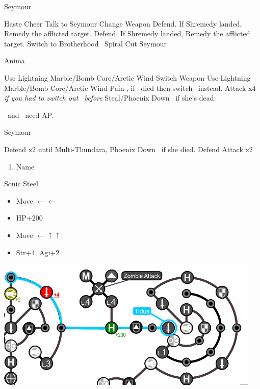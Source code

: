 \begin{battle}[3000]{Seymour}
	\begin{itemize}
		\tidusf Haste \tidus
		\tidusf Cheer
		\tidusf Talk to Seymour
		\yunaf Change Weapon
		\switch{\kimahri}{\rikku}
		\rikkuf Defend. If Shremedy landed, Remedy the afflicted target.
		\switch{\yuna}{\kimahri}
		\kimahrif Defend. If Shremedy landed, Remedy the afflicted target.
		\tidusf Switch to Brotherhood
		\tidusf \od\ Spiral Cut Seymour
	\end{itemize}
\end{battle}
\vfill
\begin{battle}[18000]{Anima}
	\begin{itemize}
		\rikkuf Use Lightning Marble/Bomb Core/Arctic Wind
		\switch{\tidus}{\wakka}
		\wakkaf Switch Weapon
		\kimahrif Use Lightning Marble/Bomb Core/Arctic Wind
		\enemyf Pain
		\switch{\wakka}{\tidus}, if \wakka\ died then switch \rikku\ instead.
		\tidusf Attack x4
		\switch{\kimahri}{\rikku} \textit{if you had to switch out \rikku\ before}
		\rikkuf Steal/Phoenix Down \yuna\ if she's dead.
	\end{itemize}
	\tidus\ and \yuna\ need AP.
\end{battle}
\begin{battle}[6000]{Seymour}
	\begin{itemize}
		\tidusf Defend x2 until Multi-Thundara, Phoenix Down \rikku\ if she died.
	      \rikkuf Defend
	      \tidusf Attack x2
	\end{itemize}
\end{battle}
\begin{enumerate}[resume]
	\item Name \shiva
\end{enumerate}
\begin{equip}
	\begin{itemize}
		\tidusf Sonic Steel
	\end{itemize}
\end{equip}
\begin{spheregrid}
	\begin{itemize}
		\tidusf
		\begin{itemize}
			\item Move $\leftarrow\leftarrow$
			\item HP+200
			\item Move $\leftarrow\uparrow\uparrow$
			\item Str+4, Agi+2
		\end{itemize}
		\includegraphics[width=.8\columnwidth]{graphics/Tidus_Post_Seymour}
	\end{itemize}
\end{spheregrid}
